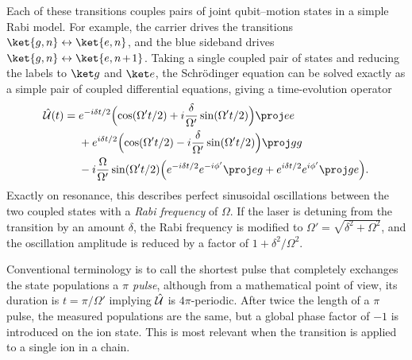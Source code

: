 Each of these transitions couples pairs of joint qubit--motion states in a simple Rabi model.
For example, the carrier drives the transitions $\ket{g,n}\leftrightarrow\ket{e,n}$, and the blue sideband drives $\ket{g,n}\leftrightarrow\ket{e,\msquash{n+1}}$.
Taking a single coupled pair of states and reducing the labels to $\ket g$ and $\ket e$, the Schr\"odinger equation can be solved exactly as a simple pair of coupled differential equations, giving a time-evolution operator
\begin{equation}\label{eq:iontrap-sideband-evolution}\begin{aligned}
\U(t) = {}
    & e^{-i\delta t/2}\Bigl(\cos(\Omega' t/2) + i \frac\delta{\Omega'}\sin(\Omega' t/2)\Bigr)\proj ee\\
    & {} + e^{i\delta t/2}\Bigl(\cos(\Omega' t/2) - i \frac\delta{\Omega'}\sin(\Omega' t/2)\Bigr)\proj gg\\
    & {} - i\frac\Omega{\Omega'}\sin(\Omega' t/2)\Bigl(
        e^{-i\delta t/2}e^{-i\phi'} \proj eg
        + e^{i\delta t/2}e^{i\phi'} \proj ge
    \Bigr).
\end{aligned}\end{equation}
Exactly on resonance, this describes perfect sinusoidal oscillations between the two coupled states with a \emph{Rabi frequency} of $\Omega$.
If the laser is detuning from the transition by an amount $\delta$, the Rabi frequency is modified to $\Omega' = \sqrt{\delta^2 + \Omega^2}$, and the oscillation amplitude is reduced by a factor of $1 + \delta^2/\Omega^2$.

Conventional terminology is to call the shortest pulse that completely exchanges the state populations a \emph{$\pi$ pulse}, although from a mathematical point of view, its duration is $t = \pi/\Omega'$ implying $\hat{\mathcal U}$ is $4\pi$-periodic.
After twice the length of a $\pi$ pulse, the measured populations are the same, but a global phase factor of $-1$ is introduced on the ion state.
This is most relevant when the transition is applied to a single ion in a chain.

